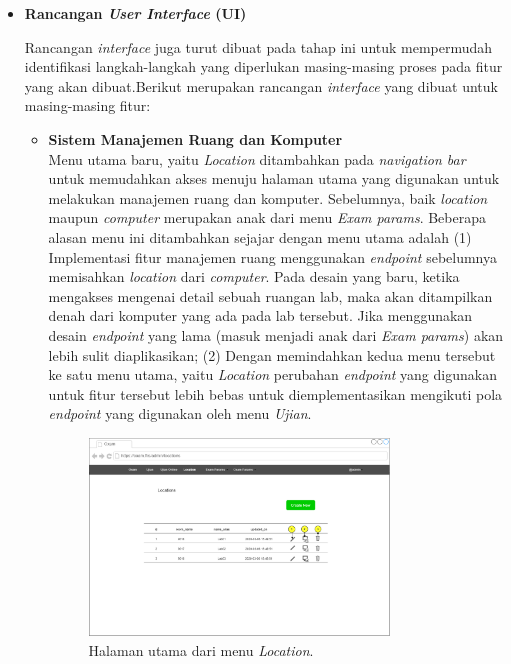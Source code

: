 \documentclass[a4paper,twoside]{article}
\begin{document}
\begin{enumerate}
		\begin{itemize}
		    \item \textbf{Rancangan \textit{User Interface} (UI)}
		    \label{design-ui}
		    
		    Rancangan \textit{interface} juga turut dibuat pada tahap ini untuk mempermudah identifikasi langkah-langkah yang diperlukan masing-masing proses pada fitur yang akan dibuat.Berikut merupakan rancangan \textit{interface} yang dibuat untuk masing-masing fitur:
		    
		    \begin{itemize}
		        \item \textbf{Sistem Manajemen Ruang dan Komputer}\\
		        \setlength\parindent{24pt}
		        Menu utama baru, yaitu \textit{Location} ditambahkan pada \textit{navigation bar}  untuk memudahkan akses menuju halaman utama yang digunakan untuk melakukan manajemen ruang dan komputer. Sebelumnya, baik \textit{location} maupun \textit{computer} merupakan anak dari menu \textit{Exam params}. Beberapa alasan menu ini ditambahkan sejajar dengan menu utama adalah (1) Implementasi fitur manajemen ruang menggunakan \textit{endpoint} sebelumnya memisahkan \textit{location} dari \textit{computer}. Pada desain yang baru, ketika mengakses mengenai detail sebuah ruangan lab, maka akan ditampilkan denah dari komputer yang ada pada lab tersebut. Jika menggunakan desain \textit{endpoint} yang lama (masuk menjadi anak dari \textit{Exam params}) akan lebih sulit diaplikasikan; (2) Dengan memindahkan kedua menu tersebut ke satu menu utama, yaitu \textit{Location} perubahan \textit{endpoint} yang digunakan untuk fitur tersebut lebih bebas untuk diemplementasikan mengikuti pola \textit{endpoint} yang digunakan oleh menu \textit{Ujian}.
		        
                 \begin{figure}[H]
                    \centering
                    \includegraphics[width=0.8\textwidth]{images/ui designs/room-management/locations.png}
                    \caption{Halaman utama dari menu \textit{Location}.}
                    \label{fig:room-mgmt-locations}
                \end{figure}
                

\end{itemize}
\end{itemize}
\end{enumerate}
\end{document}
